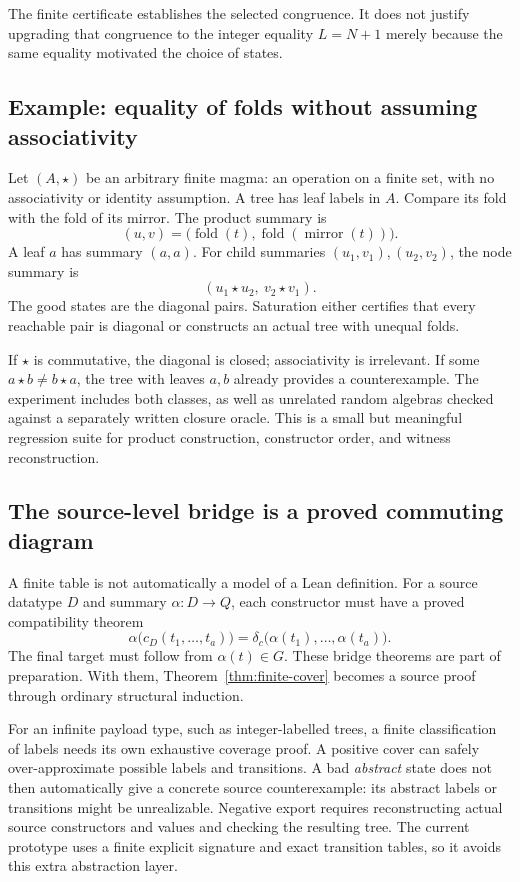 The finite certificate establishes the selected congruence. It does not justify
upgrading that congruence to the integer equality $L=N+1$ merely because the
same equality motivated the choice of states.

\subsection{Example: equality of folds without assuming associativity}
Let $(A,\star)$ be an arbitrary finite magma: an operation on a finite set, with
no associativity or identity assumption. A tree has leaf labels in $A$. Compare
its fold with the fold of its mirror. The product summary is
\[
 (u,v)=\bigl(\operatorname{fold}(t),
               \operatorname{fold}(\operatorname{mirror}(t))\bigr).
\]
A leaf $a$ has summary $(a,a)$. For child summaries $(u_1,v_1),(u_2,v_2)$, the
node summary is
\[
 (u_1\star u_2,\ v_2\star v_1).
\]
The good states are the diagonal pairs. Saturation either certifies that every
reachable pair is diagonal or constructs an actual tree with unequal folds.

If $\star$ is commutative, the diagonal is closed; associativity is irrelevant.
If some $a\star b\ne b\star a$, the tree with leaves $a,b$ already provides a
counterexample. The experiment includes both classes, as well as unrelated
random algebras checked against a separately written closure oracle. This is a
small but meaningful regression suite for product construction, constructor
order, and witness reconstruction.

\subsection{The source-level bridge is a proved commuting diagram}
\label{sec:finite-bridge}
A finite table is not automatically a model of a Lean definition. For a source
datatype $D$ and summary $\alpha:D\to Q$, each constructor must have a proved
compatibility theorem
\[
 \alpha\bigl(c_D(t_1,\ldots,t_a)\bigr)
 =\delta_c\bigl(\alpha(t_1),\ldots,\alpha(t_a)\bigr).
\]
The final target must follow from $\alpha(t)\in G$. These bridge theorems are
part of preparation. With them, Theorem~\ref{thm:finite-cover} becomes a source
proof through ordinary structural induction.

For an infinite payload type, such as integer-labelled trees, a finite
classification of labels needs its own exhaustive coverage proof. A positive
cover can safely over-approximate possible labels and transitions. A bad
\emph{abstract} state does not then automatically give a concrete source
counterexample: its abstract labels or transitions might be unrealizable.
Negative export requires reconstructing actual source constructors and values
and checking the resulting tree. The current prototype uses a finite explicit
signature and exact transition tables, so it avoids this extra abstraction
layer.


